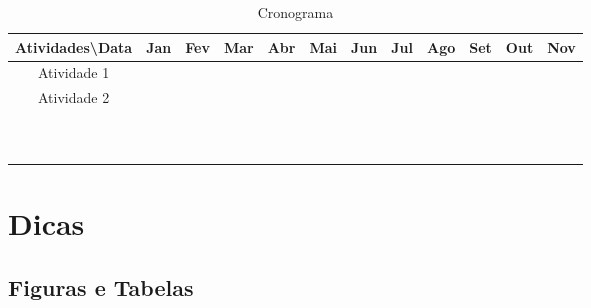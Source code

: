 \documentclass[12pt,oneside,a4paper,chapter=TITLE,english,brazil,sumario=abnt-6027-2012]{abntex2}
\begin{document}
\begin{table}[H]
	\centering
	\caption{Cronograma}
	\begin{tabular}{|c|c|c|c|c|c|c|c|c|c|c|c|}
		\toprule
		Atividades\textbackslash{}Data & Jan & Fev & Mar & Abr & Mai & Jun & Jul & Ago & Set & Out & Nov \\
		\midrule
		Atividade 1                    &     &     &     &     &     &     &     &     &     &     &     \\
		\midrule
		Atividade 2                    &     &     &     &     &     &     &     &     &     &     &     \\
		\midrule
		                               &     &     &     &     &     &     &     &     &     &     &     \\
		\midrule
		                               &     &     &     &     &     &     &     &     &     &     &     \\
		\midrule
		                               &     &     &     &     &     &     &     &     &     &     &     \\
		\midrule
		                               &     &     &     &     &     &     &     &     &     &     &     \\
		\midrule
		                               &     &     &     &     &     &     &     &     &     &     &     \\
		\midrule
		                               &     &     &     &     &     &     &     &     &     &     &     \\
		\midrule
		                               &     &     &     &     &     &     &     &     &     &     &     \\
		\midrule
		                               &     &     &     &     &     &     &     &     &     &     &     \\
		\midrule
		                               &     &     &     &     &     &     &     &     &     &     &     \\
		\midrule
		                               &     &     &     &     &     &     &     &     &     &     &     \\
		\bottomrule
	\end{tabular}%
	\label{tab:addlabel}%
\end{table}%


\chapter{Dicas}

\section {Figuras e Tabelas}
\end{document}
